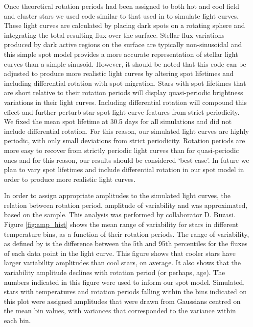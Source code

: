 Once theoretical rotation periods had been assigned to both hot and cool field
and cluster stars we used code similar to that used in \citet{Aigrain2015b} to
simulate light curves.
These light curves are calculated by placing dark spots on a rotating sphere
and integrating the total resulting flux over the surface.
Stellar flux variations produced by dark active regions on the surface are
typically non-sinusoidal and this simple spot model provides a more accurate
representation of stellar light curves than a simple sinusoid.
However, it should be noted that this code can be adjusted to produce more
realistic light curves by altering spot lifetimes and including differential
rotation with spot migration.
Stars with spot lifetimes that are short relative to their rotation periods
will display quasi-periodic brightness variations in their light curves.
Including differential rotation will compound this effect and further perturb
star spot light curve features from strict periodicity.
We fixed the mean spot lifetime at 30.5 days for all simulations and did not
include differential rotation.
For this reason, our simulated light curves are highly periodic, with only
small deviations from strict periodicity.
Rotation periods are more easy to recover from strictly periodic light curves
than for quasi-periodic ones and for this reason, our results should be
considered `best case'.
In future we plan to vary spot lifetimes and include differential rotation in
our spot model in order to produce more realistic light curves.

In order to assign appropriate amplitudes to the simulated light curves,
the relation between rotation period, amplitude of variability
and \teff was approximated, based on the \citet{Mcquillan2014} sample.
This analysis was performed by collaborator D. Buzasi.
Figure \ref{fig:amp_hist} shows the mean range of variability for stars in
different temperature bins, as a function of their rotation periods.
The range of variability, as defined by \citet{Mcquillan2014} is the
difference between the 5th and 95th percentiles for the fluxes of each data
point in the light curve.
This figure shows that cooler stars have larger variability amplitudes than
cool stars, on average.
It also shows that the variability amplitude declines with rotation period
(or perhaps, age).
The numbers indicated in this figure were used to inform our spot model.
Simulated, \trilegal stars with temperatures and rotation periods falling
within the bins indicated on this plot were assigned amplitudes that were
drawn from Gaussians centred on the mean bin values, with variances that
corresponded to the variance within each bin.

